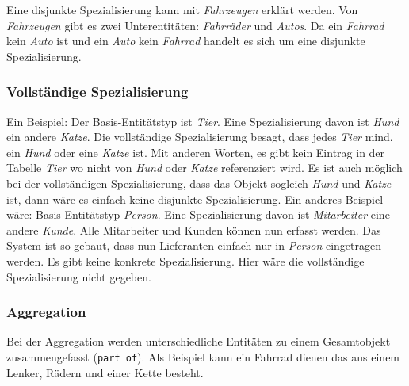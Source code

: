 Eine disjunkte Spezialisierung kann mit \emph{Fahrzeugen} erklärt werden. Von \emph{Fahrzeugen} gibt es zwei Unterentitäten: \emph{Fahrräder} und \emph{Autos}. Da ein \emph{Fahrrad} kein \emph{Auto} ist und ein \emph{Auto} kein \emph{Fahrrad} handelt es sich um eine disjunkte Spezialisierung.

\subsubsection{Vollständige Spezialisierung}

Ein Beispiel: Der Basis-Entitätstyp ist \emph{Tier}. Eine Spezialisierung davon ist \emph{Hund} ein andere \emph{Katze}. Die vollständige Spezialisierung besagt, dass jedes \emph{Tier} mind. ein \emph{Hund} oder eine \emph{Katze} ist. Mit anderen Worten, es gibt kein Eintrag in der Tabelle \emph{Tier} wo nicht von \emph{Hund} oder \emph{Katze} referenziert wird. Es ist auch möglich bei der vollständigen Spezialisierung, dass das Objekt sogleich \emph{Hund} und \emph{Katze} ist, dann wäre es einfach keine disjunkte Spezialisierung.
Ein anderes Beispiel wäre: Basis-Entitätstyp \emph{Person}. Eine Spezialisierung davon ist \emph{Mitarbeiter} eine andere \emph{Kunde}. Alle Mitarbeiter und Kunden können nun erfasst werden. Das System ist so gebaut, dass nun Lieferanten einfach nur in \emph{Person} eingetragen werden. Es gibt keine konkrete Spezialisierung. Hier wäre die vollständige Spezialisierung nicht gegeben.

\subsubsection{Aggregation}

Bei der Aggregation werden unterschiedliche Entitäten zu einem Gesamtobjekt zusammengefasst (\texttt{part of}). Als Beispiel kann ein Fahrrad dienen das aus einem Lenker, Rädern und einer Kette besteht.
